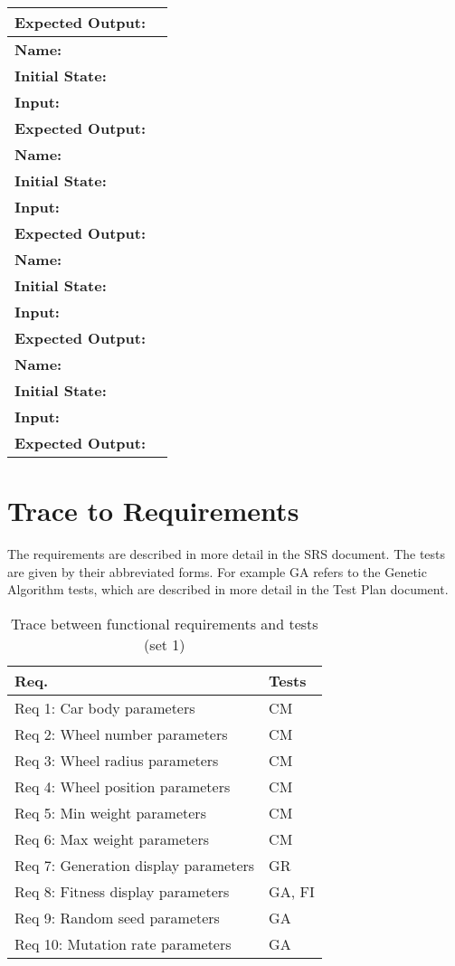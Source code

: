 \documentclass[12pt, titlepage]{article}
\begin{document}
\begin{center}
\begin{longtable}{ l | p{10cm} }
\textbf{Expected Output:} & \\[0.6em]
\hline
\rule{0pt}{1.5em}\textbf{Name:} & \\
\textbf{Initial State:} & \\
\textbf{Input:} & \\
\textbf{Expected Output:} & \\[0.6em]
\hline
\rule{0pt}{1.5em}\textbf{Name:} & \\
\textbf{Initial State:} & \\
\textbf{Input:} & \\
\textbf{Expected Output:} & \\[0.6em]
\hline
\rule{0pt}{1.5em}\textbf{Name:} & \\
\textbf{Initial State:} & \\
\textbf{Input:} & \\
\textbf{Expected Output:} & \\[0.6em]
\hline
\rule{0pt}{1.5em}\textbf{Name:} & \\
\textbf{Initial State:} & \\
\textbf{Input:} & \\
\textbf{Expected Output:} & \\[0.6em]
\end{longtable}
\end{center}



\section{Trace to Requirements}

The requirements are described in more detail in the SRS document. The tests are 
given by their abbreviated forms. For example GA refers to the Genetic Algorithm 
tests, which are described in more detail in the Test Plan document.
		
\begin{table}[H]
\centering
\begin{tabular}{p{} p{}}
\toprule
\textbf{Req.} & \textbf{Tests}\\
\midrule
Req 1: Car body parameters & CM \\
Req 2: Wheel number parameters & CM \\
Req 3: Wheel radius parameters & CM\\
Req 4: Wheel position parameters & CM\\
Req 5: Min weight parameters & CM\\
Req 6: Max weight parameters & CM\\
Req 7: Generation display parameters & GR\\
Req 8: Fitness display parameters & GA, FI\\
Req 9: Random seed parameters & GA\\
Req 10: Mutation rate parameters & GA\\
\bottomrule
\end{tabular}
\caption{Trace between functional requirements and tests (set 1)}
\label{TblRT}
\end{table}
\end{document}
